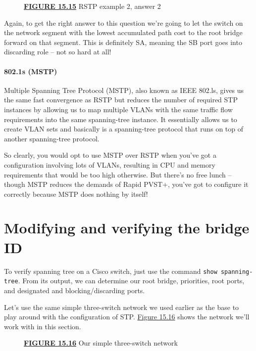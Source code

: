 \begin{figure}
\centering
\caption{{\protect\hyperlink{c15.xhtmlux5cux23figureanchor15-15}{\textbf{FIGURE
15.15}} RSTP example 2, answer 2}}
\end{figure}

Again, to get the right answer to this question we're going to let the
switch on the network segment with the lowest accumulated path cost to
the root bridge forward on that segment. This is definitely SA, meaning
the SB port goes into discarding role -- not so hard at all!

\paragraph[802.1s
(MSTP)]{\texorpdfstring{802.1s
(MSTP)}{802.1s (MSTP)}}

Multiple Spanning Tree Protocol (MSTP), also known as IEEE 802.ls, gives
us the same fast convergence as RSTP but reduces the number of required
STP instances by allowing us to map multiple VLANs with the same traffic
flow requirements into the same spanning-tree instance. It essentially
allows us to create VLAN sets and basically is a spanning-tree protocol
that runs on top of another spanning-tree protocol.

So clearly, you would opt to use MSTP over RSTP when you've got a
configuration involving lots of VLANs, resulting in CPU and memory
requirements that would be too high otherwise. But there's no free
lunch -- though MSTP reduces the demands of Rapid PVST+, you've got to
configure it correctly because MSTP does nothing by itself!

\section{Modifying and verifying the bridge ID}

To verify spanning tree on a Cisco switch, just use the command
\texttt{show\ spanning-tree}. From its output, we can determine our root
bridge, priorities, root ports, and designated and blocking/discarding
ports.

Let's use the same simple three-switch network we used earlier as the
base to play around with the configuration of STP.
\protect\hyperlink{c15.xhtmlux5cux23figure15-16}{Figure 15.16} shows the
network we'll work with in this section.

\begin{figure}
\centering
\caption{{\protect\hyperlink{c15.xhtmlux5cux23figureanchor15-16}{\textbf{FIGURE
15.16}} Our simple three-switch network}}
\end{figure}

